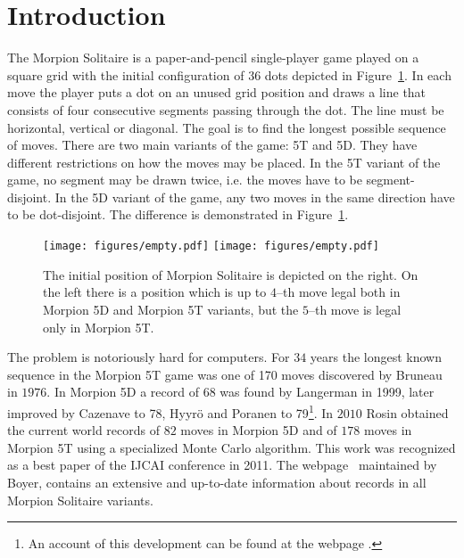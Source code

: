 \section{Introduction}
The Morpion Solitaire is a paper-and-pencil single-player game played on a square grid with 
  the initial configuration of 36 dots depicted in Figure~\ref{fig:initial}. 
In each move the player puts a dot on an unused grid position and draws a line that 
  consists of four consecutive segments passing through the dot. 
The line must be horizontal, vertical or diagonal. 
The goal is to find the longest possible sequence of moves.
There are two main variants of the game: 5T and 5D. 
They have different restrictions on how the moves may be placed.
In the 5T variant of the game, no segment may be drawn twice, i.e. the moves have to be segment-disjoint. 
In the 5D variant of the game, any two moves in the same direction have to be dot-disjoint.
The difference is demonstrated in Figure~\ref{fig:initial}.

  \begin{figure}
    \centering
      \texttt{[image: figures/empty.pdf]}
      \texttt{[image: figures/empty.pdf]}
      \caption{\label{fig:initial}
	The initial position of Morpion Solitaire is depicted on the right. On the left there is a position which is up to $4$--th move legal 
both in Morpion 5D and Morpion 5T variants, but the $5$--th move is legal only in Morpion 5T. 
      }
\end{figure}

The problem is notoriously hard for computers. 
For $34$ years the longest known sequence in the Morpion 5T game
  was one of 170 moves discovered by Bruneau in $1976$. In Morpion 5D a record of 68 was found by Langerman in 1999, later improved by Cazenave \cite{tristan78} to 78, Hyyrö and Poranen \cite{finowie} to 79\footnote{An account of this development can be found at the webpage \cite{langerman}.}.
In $2010$ Rosin \cite{rosin} obtained the current world records of $82$ moves in Morpion 5D and of $178$ moves in Morpion 5T 
  using a specialized Monte Carlo algorithm. This work  was
   recognized as a best paper of the IJCAI conference in 2011. The webpage~\cite{boyer} maintained by Boyer, contains an extensive and up-to-date information about records in all Morpion Solitaire variants.

